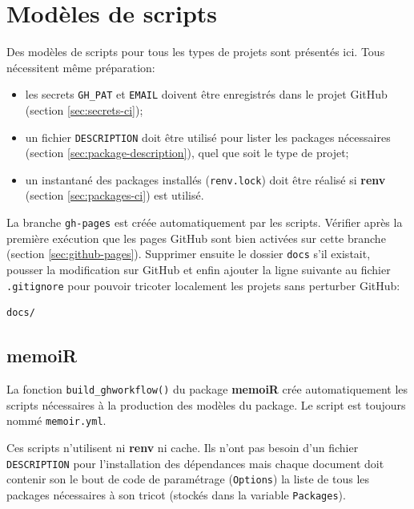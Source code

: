 \documentclass[
  12pt,
  french,
  a4paper,
  extrafontsizes,onecolumn,openright
  ]{memoir}
\providecommand{\tightlist}{%
  \setlength{\itemsep}{0pt}\setlength{\parskip}{0pt}}
\begin{document}
\hypertarget{moduxe8les-de-scripts}{%
\section{Modèles de scripts}\label{moduxe8les-de-scripts}}

Des modèles de scripts pour tous les types de projets sont présentés ici.
Tous nécessitent même préparation:

\begin{itemize}
\tightlist
\item
  les secrets \texttt{GH\_PAT} et \texttt{EMAIL} doivent être enregistrés dans le projet GitHub (section \ref{sec:secrets-ci});
\item
  un fichier \texttt{DESCRIPTION} doit être utilisé pour lister les packages nécessaires (section \ref{sec:package-description}), quel que soit le type de projet;
\item
  un instantané des packages installés (\texttt{renv.lock}) doit être réalisé si \textbf{renv} (section \ref{sec:packages-ci}) est utilisé.
\end{itemize}

La branche \texttt{gh-pages} est créée automatiquement par les scripts.
Vérifier après la première exécution que les pages GitHub sont bien activées sur cette branche (section \ref{sec:github-pages}).
Supprimer ensuite le dossier \texttt{docs} s'il existait, pousser la modification sur GitHub et enfin ajouter la ligne suivante au fichier \texttt{.gitignore} pour pouvoir tricoter localement les projets sans perturber GitHub:

\begin{verbatim}
docs/
\end{verbatim}

\hypertarget{sec:memoiR-ci}{%
\subsection{memoiR}\label{sec:memoiR-ci}}

La fonction \texttt{build\_ghworkflow()} du package \textbf{memoiR} crée automatiquement les scripts nécessaires à la production des modèles du package.
Le script est toujours nommé \texttt{memoir.yml}.

Ces scripts n'utilisent ni \textbf{renv} ni cache.
Ils n'ont pas besoin d'un fichier \texttt{DESCRIPTION} pour l'installation des dépendances mais chaque document doit contenir son le bout de code de paramétrage (\texttt{Options}) la liste de tous les packages nécessaires à son tricot (stockés dans la variable \texttt{Packages}).
\end{document}
